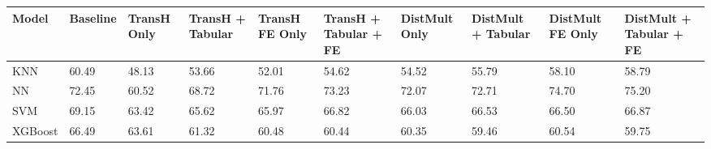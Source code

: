 \begin{tabular}{llllllllll}
\toprule
Model & Baseline & TransH Only & TransH + Tabular & TransH FE Only & TransH + Tabular + FE & DistMult Only & DistMult + Tabular & DistMult FE Only & DistMult + Tabular + FE \\
\midrule
KNN & 60.49 & 48.13 & 53.66 & 52.01 & 54.62 & 54.52 & 55.79 & 58.10 & 58.79 \\
NN & 72.45 & 60.52 & 68.72 & 71.76 & 73.23 & 72.07 & 72.71 & 74.70 & 75.20 \\
SVM & 69.15 & 63.42 & 65.62 & 65.97 & 66.82 & 66.03 & 66.53 & 66.50 & 66.87 \\
XGBoost & 66.49 & 63.61 & 61.32 & 60.48 & 60.44 & 60.35 & 59.46 & 60.54 & 59.75 \\
\bottomrule
\end{tabular}

